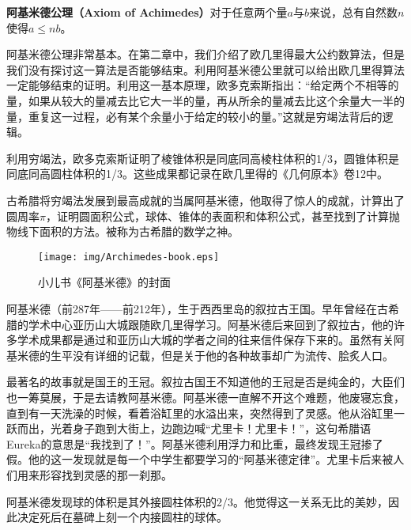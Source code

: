 \documentclass{article}
\begin{document}
\begin{axiom}
\textbf{阿基米德公理（Axiom of Achimedes）}对于任意两个量$a$与$b$来说，总有自然数$n$使得$a \leq nb$。
\end{axiom}

阿基米德公理非常基本。在第二章中，我们介绍了欧几里得最大公约数算法，但是我们没有探讨这一算法是否能够结束。利用阿基米德公里就可以给出欧几里得算法一定能够结束的证明。利用这一基本原理，欧多克索斯指出：“给定两个不相等的量，如果从较大的量减去比它大一半的量，再从所余的量减去比这个余量大一半的量，重复这一过程，必有某个余量小于给定的较小的量。”这就是穷竭法背后的逻辑。

利用穷竭法，欧多克索斯证明了棱锥体积是同底同高棱柱体积的1/3，圆锥体积是同底同高圆柱体积的1/3。这些成果都记录在欧几里得的《几何原本》卷12中\cite{HanXueTao16}。

古希腊将穷竭法发展到最高成就的当属阿基米德，他取得了惊人的成就，计算出了圆周率$\pi$，证明圆面积公式，球体、锥体的表面积和体积公式，甚至找到了计算抛物线下面积的方法。被称为古希腊的数学之神。

\begin{wrapfigure}{R}{0.4\textwidth}
 \centering
 \texttt{[image: img/Archimedes-book.eps]}
 \captionsetup{labelformat=empty}
 \caption{小儿书《阿基米德》的封面}
 \label{fig:Archimedes-book}
\end{wrapfigure}

阿基米德（前287年——前212年），生于西西里岛的叙拉古王国。早年曾经在古希腊的学术中心亚历山大城跟随欧几里得学习。阿基米德后来回到了叙拉古，他的许多学术成果都是通过和亚历山大城的学者之间的往来信件保存下来的。虽然有关阿基米德的生平没有详细的记载，但是关于他的各种故事却广为流传、脍炙人口。

最著名的故事就是国王的王冠。叙拉古国王不知道他的王冠是否是纯金的，大臣们也一筹莫展，于是去请教阿基米德。阿基米德一直解不开这个难题，他废寝忘食，直到有一天洗澡的时候，看着浴缸里的水溢出来，突然得到了灵感。他从浴缸里一跃而出，光着身子跑到大街上，边跑边喊“尤里卡！尤里卡！”，这句希腊语Eureka的意思是“我找到了！”。阿基米德利用浮力和比重，最终发现王冠掺了假。他的这一发现就是每一个中学生都要学习的“阿基米德定律”。尤里卡后来被人们用来形容找到灵感的那一刹那。

阿基米德发现球的体积是其外接圆柱体积的2/3。他觉得这一关系无比的美妙，因此决定死后在墓碑上刻一个内接圆柱的球体。
\end{document}

